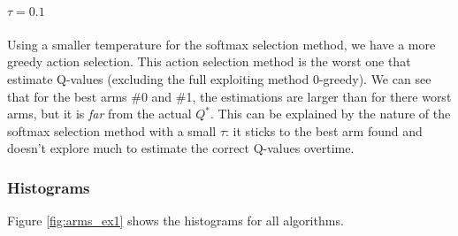 \documentclass[letterpaper]{article}
\begin{document}
\paragraph{$\tau = 0.1$} Using a smaller temperature for the softmax
selection method, we have a more greedy action selection.
This action selection method is the worst one that estimate Q-values
(excluding the full exploiting method 0-greedy). We can see that
for the best arms \#0 and \#1, the estimations are larger than for there
worst arms, but it is \textit{far} from the actual $Q^*$. This can be explained
by the nature of the softmax selection method with a
small $\tau$: it sticks to the best arm
found and doesn't explore much to estimate the correct Q-values overtime.

\subsubsection{Histograms}

\label{sec:ex1_histo}

Figure \ref{fig:arms_ex1} shows the histograms for all algorithms.
\end{document}
